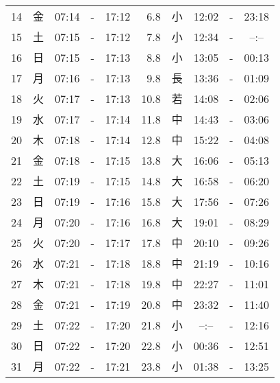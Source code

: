 \documentclass[a4j,10pt]{jsarticle}
\begin{document}
\begin{center}
\begin{table}[ht]
\begin{center}
\begin{tabular}{|rc|ccc|rc|ccc|}
 14 & 金 & 07:14 &-& 17:12 &  6.8 & 小 & 12:02 &-& 23:18 \\
 15 & 土 & 07:15 &-& 17:12 &  7.8 & 小 & 12:34 &-& --:-- \\
 16 & 日 & 07:15 &-& 17:13 &  8.8 & 小 & 13:05 &-& 00:13 \\
 17 & 月 & 07:16 &-& 17:13 &  9.8 & 長 & 13:36 &-& 01:09 \\
 18 & 火 & 07:17 &-& 17:13 & 10.8 & 若 & 14:08 &-& 02:06 \\
 19 & 水 & 07:17 &-& 17:14 & 11.8 & 中 & 14:43 &-& 03:06 \\
 20 & 木 & 07:18 &-& 17:14 & 12.8 & 中 & 15:22 &-& 04:08 \\
 21 & 金 & 07:18 &-& 17:15 & 13.8 & 大 & 16:06 &-& 05:13 \\
 22 & 土 & 07:19 &-& 17:15 & 14.8 & 大 & 16:58 &-& 06:20 \\
 23 & 日 & 07:19 &-& 17:16 & 15.8 & 大 & 17:56 &-& 07:26 \\
 24 & 月 & 07:20 &-& 17:16 & 16.8 & 大 & 19:01 &-& 08:29 \\
 25 & 火 & 07:20 &-& 17:17 & 17.8 & 中 & 20:10 &-& 09:26 \\
 26 & 水 & 07:21 &-& 17:18 & 18.8 & 中 & 21:19 &-& 10:16 \\
 27 & 木 & 07:21 &-& 17:18 & 19.8 & 中 & 22:27 &-& 11:01 \\
 28 & 金 & 07:21 &-& 17:19 & 20.8 & 中 & 23:32 &-& 11:40 \\
 29 & 土 & 07:22 &-& 17:20 & 21.8 & 小 & --:-- &-& 12:16 \\
 30 & 日 & 07:22 &-& 17:20 & 22.8 & 小 & 00:36 &-& 12:51 \\
 31 & 月 & 07:22 &-& 17:21 & 23.8 & 小 & 01:38 &-& 13:25 \\
\hline
\end{tabular}
\end{center}
\end{table}
\newpage
\end{center}
\end{document}
